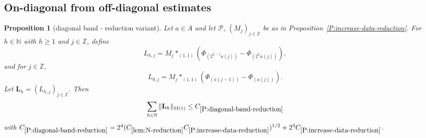 \documentclass[12pt,reqno]{amsart}
\theoremstyle{plain}
\newtheorem{proposition}[theorem]{Proposition}
\numberwithin{equation}{section}
\theoremstyle{remark}
\newcommand{\using}[1]{}
\newcommand{\Z}{{\mathbb Z}}
\newcommand{\N}{{\mathbb N}}
\begin{document}
\subsection{On-diagonal from off-diagonal estimates}\label{sec:on-diag}
\begin{proposition}[diagonal band - reduction variant]
\label{P:diagonal-band-reduction}\using{P:increase-data-reduction}\using{convolution vector}\using{Cauchy-Schwarz at k}\using{lem:N-reduction}\using{Cauchy-Schwarz at n-1}
Let $a\in A$ and let $\mathcal P$, $(M_j)_{j\in \Z}$ be as in Proposition~\ref{P:increase-data-reduction}. For $h\in\N$ with $h\ge1$ and $j\in\Z$, define
\begin{equation}\label{auto:diagonal-band-positive-scale}
L_{h,j}= M_j \ast_{(1,1)} (\Phi_{(2^{h-1}a(j))}-\Phi_{(2^{h}a(j))}),
\end{equation}
and for $j\in \Z$,
\begin{equation}\label{auto:diagonal-band-zero-scale}
L_{0,j}=M_j \ast_{(1,1)} (\Phi_{(a(j-1))}-\Phi_{(a(j))}).
\end{equation}
Let $\mathbf{L}_h=(L_{h,j})_{j\in \Z}$. Then
\begin{equation}\label{auto:diagonal-band-sum-bound}
\sum_{h\in \N} \|\mathbf{L}_h\|_{\rm M(1)} \leq C_{\ref{P:diagonal-band-reduction}}
\end{equation}
with  $C_{\ref{P:diagonal-band-reduction}} = 2^4(
    C_{\ref{lem:N-reduction}}
    C_{\ref{P:increase-data-reduction}}
  )^{1/2} + 2^3 C_{\ref{P:increase-data-reduction}}$.
\end{proposition}
\end{document}
